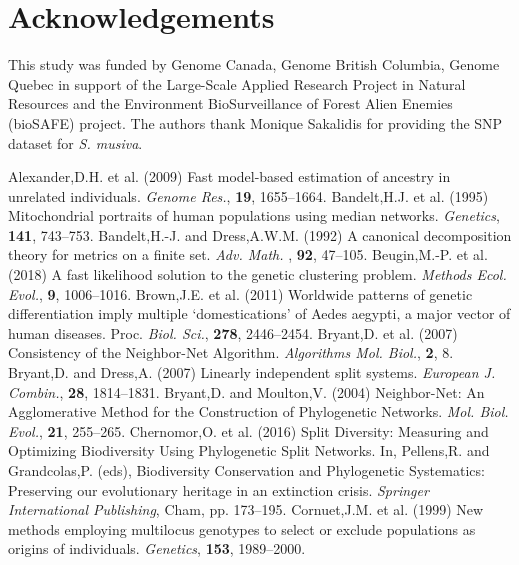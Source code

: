 \documentclass{bioinfo}
\begin{document}
\section*{Acknowledgements}
This study was funded by Genome Canada, Genome British Columbia, Genome Quebec in support of the Large-Scale Applied Research Project in Natural Resources and the Environment BioSurveillance of Forest Alien Enemies (bioSAFE) project. The authors thank Monique Sakalidis for providing the SNP dataset for \textit{S. musiva}.

%
%
%
%
%
%

%
\begin{thebibliography}{}

\bibitem[a ()]{}
\bibitem[a ()]{}Alexander,D.H. et al. (2009) Fast model-based estimation of ancestry in unrelated individuals. \textit{Genome Res.}, \textbf{19}, 1655–1664.
\bibitem[a ()]{}Bandelt,H.J. et al. (1995) Mitochondrial portraits of human populations using median networks. \textit{Genetics}, \textbf{141}, 743–753.
\bibitem[a ()]{}Bandelt,H.-J. and Dress,A.W.M. (1992) A canonical decomposition theory for metrics on a finite set. \textit{Adv. Math. }, \textbf{92}, 47–105.
\bibitem[a ()]{}Beugin,M.-P. et al. (2018) A fast likelihood solution to the genetic clustering problem. \textit{Methods Ecol. Evol.}, \textbf{9}, 1006–1016.
\bibitem[a ()]{}Brown,J.E. et al. (2011) Worldwide patterns of genetic differentiation imply multiple ‘domestications’ of Aedes aegypti, a major vector of human diseases. Proc. \textit{Biol. Sci.}, \textbf{278}, 2446–2454.
\bibitem[a ()]{}Bryant,D. et al. (2007) Consistency of the Neighbor-Net Algorithm. \textit{Algorithms Mol. Biol.}, \textbf{2}, 8.
\bibitem[a ()]{}Bryant,D. and Dress,A. (2007) Linearly independent split systems. \textit{European J. Combin.}, \textbf{28}, 1814–1831.
\bibitem[a ()]{}Bryant,D. and Moulton,V. (2004) Neighbor-Net: An Agglomerative Method for the Construction of Phylogenetic Networks. \textit{Mol. Biol. Evol.}, \textbf{21}, 255–265.
\bibitem[a ()]{}Chernomor,O. et al. (2016) Split Diversity: Measuring and Optimizing Biodiversity Using Phylogenetic Split Networks. In, Pellens,R. and Grandcolas,P. (eds), Biodiversity Conservation and Phylogenetic Systematics: Preserving our evolutionary heritage in an extinction crisis. \textit{Springer International Publishing}, Cham, pp. 173–195.
\bibitem[a ()]{}Cornuet,J.M. et al. (1999) New methods employing multilocus genotypes to select or exclude populations as origins of individuals. \textit{Genetics}, \textbf{153}, 1989–2000.

\end{thebibliography}
\end{document}

